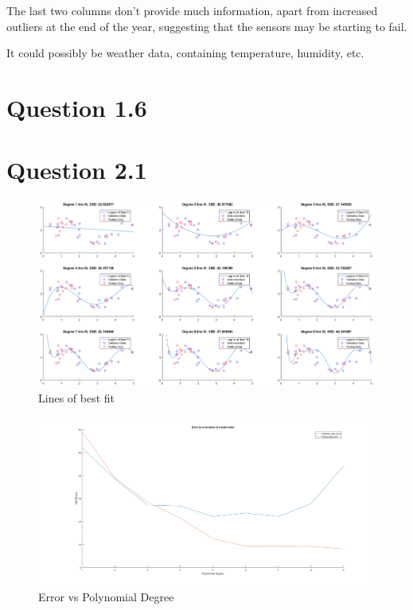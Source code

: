 The last two columns don't provide much information, apart from increased outliers at the end of the year, suggesting that the sensors may be starting to fail.

It could possibly be weather data, containing temperature, humidity, etc.

\section*{Question 1.6}



\section*{Question 2.1}

\begin{figure}[H]
    \includegraphics[width=\linewidth]{../../pracs/week3/images/q1_lines_of_best_fit}
    \centering
    \caption{Lines of best fit}
\end{figure}

\begin{figure}[H]
    \includegraphics[width=\linewidth]{../../pracs/week3/images/q1_err_vs_degree}
    \centering
    \caption{Error vs Polynomial Degree}
\end{figure}

